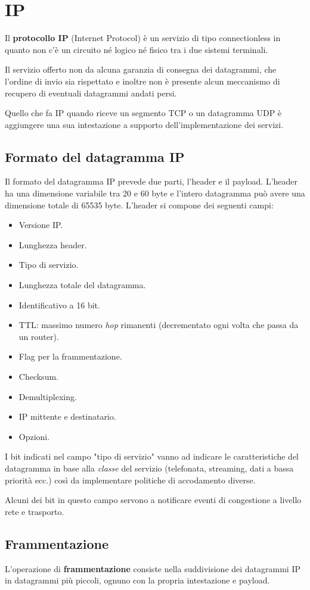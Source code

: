 \section{IP}
Il \textbf{protocollo IP} (Internet Protocol) è un servizio di tipo 
connectionless in quanto non c'è un circuito né logico né fisico tra i
due sistemi terminali.

Il servizio offerto non da alcuna garanzia di consegna dei datagrammi,
che l'ordine di invio sia rispettato e inoltre non è presente alcun 
meccanismo di recupero di eventuali datagrammi andati persi.

Quello che fa IP quando riceve un segmento TCP o un datagramma UDP è
aggiungere una sua intestazione a supporto dell'implementazione dei
servizi.

\subsection{Formato del datagramma IP}
Il formato del datagramma IP prevede due parti, l'header e il payload. 
L'header ha una dimensione variabile tra 20 e 60 byte e l'intero
datagramma può avere una dimensione totale di 65535 byte. L'header si
compone dei seguenti campi:
\begin{itemize}
	\item Versione IP.
	\item Lunghezza header.
	\item Tipo di servizio.
	\item Lunghezza totale del datagramma.
	\item Identificativo a 16 bit.
	\item TTL: massimo numero \emph{hop} rimanenti (decrementato ogni
		volta che passa da un router).
	\item Flag per la frammentazione.
	\item Checksum.
	\item Demultiplexing.
	\item IP mittente e destinatario.
	\item Opzioni.
\end{itemize}
I bit indicati nel campo "tipo di servizio" vanno ad indicare le 
caratteristiche del datagramma in base alla \emph{classe} del servizio
(telefonata, streaming, dati a bassa priorità ecc.) così da 
implementare politiche di accodamento diverse.

Alcuni dei bit in questo campo servono a notificare eventi di
congestione a livello rete e trasporto.

\subsection{Frammentazione}
L'operazione di \textbf{frammentazione} consiste nella suddivisione dei
datagrammi IP in datagrammi più piccoli, ognuno con la propria
intestazione e payload.

